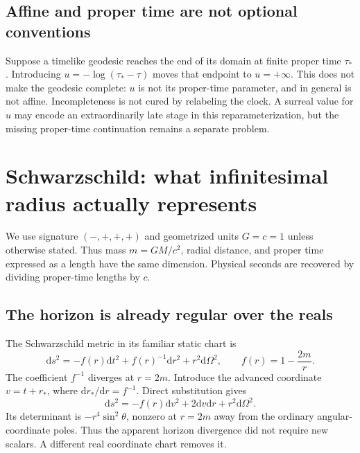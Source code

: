 \documentclass[11pt,letterpaper]{article}
\newcommand{\dd}{\mathrm{d}}
\theoremstyle{definition}
\theoremstyle{remark}
\begin{document}
\subsection{Affine and proper time are not optional conventions}

Suppose a timelike geodesic reaches the end of its domain at finite proper time
$\tau_*$. Introducing $u=-\log(\tau_*-\tau)$ moves that endpoint to $u=+\infty$.
This does not make the geodesic complete: $u$ is not its proper-time parameter,
and in general is not affine. Incompleteness is not cured by relabeling the
clock. A surreal value for $u$ may encode an extraordinarily late stage in
this reparameterization, but the missing proper-time continuation remains a
separate problem.

\section{Schwarzschild: what infinitesimal radius actually represents}
\label{sec:schwarzschild}

We use signature $(-,+,+,+)$ and geometrized units $G=c=1$ unless otherwise
stated. Thus mass $m=GM/c^2$, radial distance, and proper time expressed as a
length have the same dimension. Physical seconds are recovered by dividing
proper-time lengths by $c$.

\subsection{The horizon is already regular over the reals}

The Schwarzschild metric in its familiar static chart is
\begin{equation}
 \dd s^2=-f(r)\dd t^2+f(r)^{-1}\dd r^2+r^2\dd\Omega^2,
 \qquad f(r)=1-\frac{2m}{r}.
 \label{eq:schwarzmetric}
\end{equation}
The coefficient $f^{-1}$ diverges at $r=2m$. Introduce the advanced coordinate
$v=t+r_*$, where $\dd r_*/\dd r=f^{-1}$. Direct substitution gives
\begin{equation}
 \dd s^2=-f(r)\dd v^2+2\dd v\dd r+r^2\dd\Omega^2.
 \label{eq:ef}
\end{equation}
Its determinant is $-r^4\sin^2\theta$, nonzero at $r=2m$ away from the ordinary
angular-coordinate poles. Thus the apparent horizon divergence did not require
new scalars. A different real coordinate chart removes it.
\end{document}
